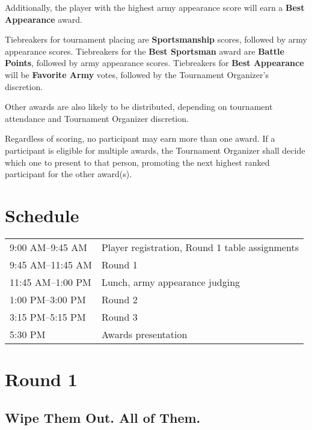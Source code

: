 \documentclass[12pt,titlepage]{article}
\begin{document}
Additionally, the player with the highest army appearance score will earn a \textbf{Best Appearance} award.

Tiebreakers for tournament placing are \textbf{Sportsmanship} scores, followed by army appearance scores. Tiebreakers for the \textbf{Best Sportsman} award are \textbf{Battle Points}, followed by army appearance scores. Tiebreakers for \textbf{Best Appearance} will be \textbf{Favorite Army} votes, followed by the Tournament Organizer's discretion.

Other awards are also likely to be distributed, depending on tournament attendance and Tournament Organizer discretion.

Regardless of scoring, no participant may earn more than one award. If a participant is eligible for multiple awards, the Tournament Organizer shall decide which one to present to that person, promoting the next highest ranked participant for the other award(s).


\section*{Schedule}

\begin{tabular}[t]{@{}l@{\quad}l@{}}
\phantom{1}9:00 AM--\phantom{1}9:45 AM & Player registration, Round 1 table assignments \\
\phantom{1}9:45 AM--11:45 AM & Round 1 \\
11:45 AM--\phantom{1}1:00 PM & Lunch, army appearance judging \\
\phantom{1}1:00 PM--\phantom{1}3:00 PM & Round 2 \\
\phantom{1}3:15 PM--\phantom{1}5:15 PM & Round 3 \\
\phantom{1}5:30 PM & Awards presentation
\end{tabular}

\newpage
{}
\section*{Round 1}
\subsection*{Wipe Them Out. All of Them.}
\end{document}
